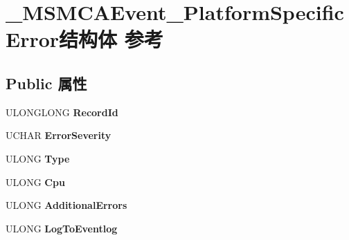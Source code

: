 \hypertarget{struct___m_s_m_c_a_event___platform_specific_error}{}\section{\+\_\+\+M\+S\+M\+C\+A\+Event\+\_\+\+Platform\+Specific\+Error结构体 参考}
\label{struct___m_s_m_c_a_event___platform_specific_error}
\subsection*{Public 属性}
\begin{DoxyCompactItemize}
\item 
\mbox{\label{struct___m_s_m_c_a_event___platform_specific_error_a6037fe363a7dc6a494365d2be03db530}} 
U\+L\+O\+N\+G\+L\+O\+NG {\bfseries Record\+Id}
\item 
\mbox{\label{struct___m_s_m_c_a_event___platform_specific_error_a9b5b1d9a9d7d252ca9f616079b6bca33}} 
U\+C\+H\+AR {\bfseries Error\+Severity}
\item 
\mbox{\label{struct___m_s_m_c_a_event___platform_specific_error_a8467deadd33a8e2a4a8ce55111676061}} 
U\+L\+O\+NG {\bfseries Type}
\item 
\mbox{\label{struct___m_s_m_c_a_event___platform_specific_error_a289c2d59d2d04646a00cd4534716ae2d}} 
U\+L\+O\+NG {\bfseries Cpu}
\item 
\mbox{\label{struct___m_s_m_c_a_event___platform_specific_error_a5700a258d4f10d52979ee30242c2d182}} 
U\+L\+O\+NG {\bfseries Additional\+Errors}
\item 
\mbox{\label{struct___m_s_m_c_a_event___platform_specific_error_ab3bab5f86f2d0765e37becd9d3a18e6e}} 
U\+L\+O\+NG {\bfseries Log\+To\+Eventlog}
\item 
\mbox{\label{struct___m_s_m_c_a_event___platform_specific_error_a33ef860c7c5e5142de5fe5ab47431905}} 

\end{DoxyCompactItemize}
